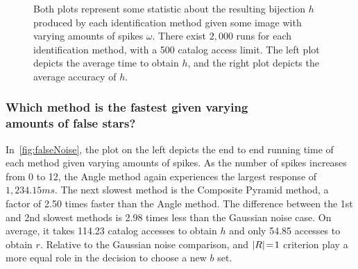 \documentclass[conference]{IEEEtran}
\begin{document}
\begin{figure*}
{\begin{subfigure}[b]{0.48\linewidth}
        \end{subfigure}
        \caption{
        Both plots represent some statistic about the resulting bijection $h$ produced by each identification method
        given some image with varying amounts of spikes $\omega$.
        There exist $2{,}000$ runs for each identification method, with a 500 catalog access limit.
        The left plot depicts the average time to obtain $h$, and the right plot depicts the average accuracy of $h$.
        }\label{fig:falseNoise}
        }
    \end{figure*}

    \subsubsection{Which method is the fastest given varying \\ amounts of false stars?}
    In~\autoref{fig:falseNoise}, the plot on the left depicts the end to end running time of each method given varying
    amounts of spikes.
    As the number of spikes increases from 0 to 12, the Angle method again experiences the largest response of
    $1{,}234.15\si{ms}$.
    The next slowest method is the Composite Pyramid method, a factor of 2.50 times faster than the Angle method.
    The difference between the 1st and 2nd slowest methods is 2.98 times less than the Gaussian noise case.
    On average, it takes 114.23 catalog accesses to obtain $h$ and only 54.85 accesses to obtain $r$.
    Relative to the Gaussian noise comparison,  and $\left| R \right| \!=\! 1$ criterion play a more equal role in
    the decision to choose a new $b$ set.
\end{document}
